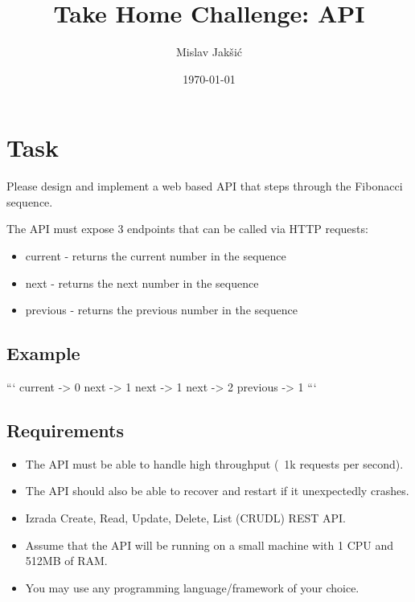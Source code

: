 \documentclass{article}
\title{Take Home Challenge: API}
\author{Mislav Jakšić}
\date{\today}
\begin{document}
\maketitle

\section{Task}

Please design and implement a web based API that steps through the Fibonacci sequence.

The API must expose 3 endpoints that can be called via HTTP requests:
\begin{itemize}
  \item current - returns the current number in the sequence
  \item next - returns the next number in the sequence
  \item previous - returns the previous number in the sequence
\end{itemize}

\subsection{Example}

```
current -> 0
next -> 1
next -> 1
next -> 2
previous -> 1
```

\subsection{Requirements}

\begin{itemize}
  \item The API must be able to handle high throughput (~1k requests per second).
  \item The API should also be able to recover and restart if it unexpectedly crashes.
  \item Izrada Create, Read, Update, Delete, List (CRUDL) REST API.
  \item Assume that the API will be running on a small machine with 1 CPU and 512MB of RAM.
  \item You may use any programming language/framework of your choice.
\end{itemize}
\end{document}
